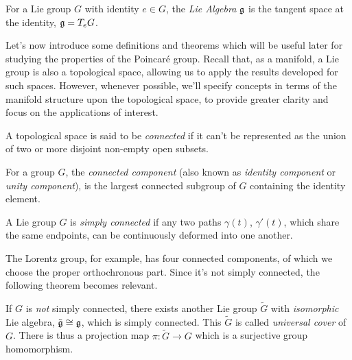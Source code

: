 \begin{definition}
    For a Lie group $G$ with identity $e \in G$, the \emph{Lie Algebra} $\mathfrak{g}$ is the tangent space at the identity, $\mathfrak{g} = T_e G$.
\end{definition}


Let's now introduce some definitions and theorems which will be useful later for studying the properties of the Poincaré group. Recall that, as a manifold, a Lie group is also a topological space, allowing us to apply the results developed for such spaces. However, whenever possible, we'll specify concepts in terms of the manifold structure upon the topological space, to provide greater clarity and focus on the applications of interest.

\begin{definition}\label{def:connected}
    A topological space is said to be \emph{connected} if it can't be represented as the union of two or more disjoint non-empty open subsets.
\end{definition}

\begin{definition}\label{def:connected-component}
    For a group $G$, the \emph{connected component} (also known as \emph{identity component} or \emph{unity component}), is the largest connected subgroup of $G$ containing the identity element.
\end{definition}

\begin{definition}\label{def:simply-connected}
    A Lie group $G$ is \emph{simply connected} if any two paths $\gamma(t)$, $\gamma'(t)$, which share the same endpoints, can be continuously deformed into one another.
\end{definition}

The Lorentz group, for example, has four connected components, of which we choose the proper orthochronous part. Since it's not simply connected, the following theorem becomes relevant.

\begin{theorem}\label{th:universal-cover}
    If $G$ is \emph{not} simply connected, there exists another Lie group $\tilde{G}$ with \emph{isomorphic} Lie algebra, $\tilde{\mathfrak{g}} \cong \mathfrak{g}$, which is simply connected. This $\tilde{G}$ is called \emph{universal cover} of $G$. There is thus a projection map $\pi \colon \tilde{G} \to G$ which is a surjective group homomorphism.
\end{theorem}

